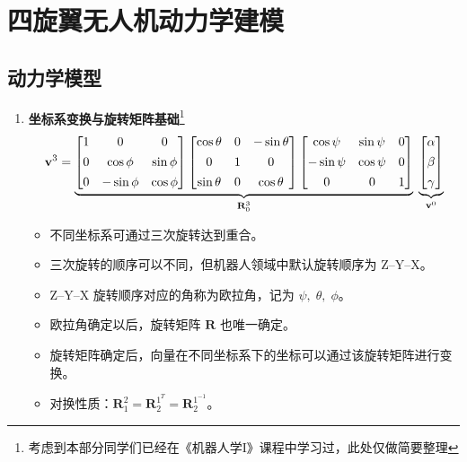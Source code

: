 \documentclass[../main.tex]{subfiles}
\begin{document}
\section{四旋翼无人机动力学建模}
\subsection{动力学模型}
\begin{enumerate}
    \item \textbf{坐标系变换与旋转矩阵基础}\footnote{考虑到本部分同学们已经在《机器人学I》课程中学习过，此处仅做简要整理}
    \[
    \mathbf{v}^3 =
    \underbrace{%
    \begin{bmatrix}
    1 & 0 & 0\\[4pt]
    0 & \cos\phi & \sin\phi\\[4pt]
    0 & -\sin\phi & \cos\phi
    \end{bmatrix}
    \begin{bmatrix}
    \cos\theta & 0 & -\sin\theta\\[4pt]
    0 & 1 & 0\\[4pt]
    \sin\theta & 0 & \cos\theta
    \end{bmatrix}
    \begin{bmatrix}
    \cos\psi & \sin\psi & 0\\[4pt]
    -\sin\psi & \cos\psi & 0\\[4pt]
    0 & 0 & 1
    \end{bmatrix}%
    }_{\mathbf{R}_0^3}
    \;
    \underbrace{\begin{bmatrix}\alpha\\[4pt]\beta\\[4pt]\gamma\end{bmatrix}}_{\mathbf{v}^0}
    \]
    
    \begin{itemize}
      \item 不同坐标系可通过三次旋转达到重合。
      \item 三次旋转的顺序可以不同，但机器人领域中默认旋转顺序为 Z–Y–X。
      \item Z–Y–X 旋转顺序对应的角称为欧拉角，记为 $\psi,\;\theta,\;\phi$。
      \item 欧拉角确定以后，旋转矩阵 $\mathbf{R}$ 也唯一确定。
      \item 旋转矩阵确定后，向量在不同坐标系下的坐标可以通过该旋转矩阵进行变换。
      \item 对换性质：$\mathbf{R}_1^2=\mathbf{R}_2^{1^T}=\mathbf{R}_2^{1^{-1}}$。
    \end{itemize}


\end{enumerate}
\end{document}
